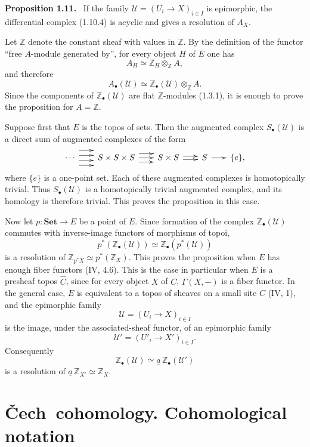\documentclass[11pt]{article}
\newcommand{\Set}{\mathbf{Set}}
\newcommand{\ZZ}{\mathbb Z}
\newcommand{\Cech}{\v{C}ech}
\newenvironment{statement}[1]{\par\medskip\noindent\textbf{#1.}\ }{\par\medskip}
\begin{document}
\begin{statement}{Proposition 1.11}
If the family $\mathcal U=(U_i\to X)_{i\in I}$ is epimorphic, the differential complex (1.10.4) is acyclic and gives a resolution of $A_X$.
\end{statement}

Let $\ZZ$ denote the constant sheaf with values in $\ZZ$. By the definition of the functor ``free $A$-module generated by'', for every object $H$ of $E$ one has
\[
A_H\simeq \ZZ_H\otimes_{\ZZ}A,
\]
and therefore
\[
A_\bullet(\mathcal U)\simeq \ZZ_\bullet(\mathcal U)\otimes_{\ZZ}A.
\]
Since the components of $\ZZ_\bullet(\mathcal U)$ are flat $\ZZ$-modules (1.3.1), it is enough to prove the proposition for $A=\ZZ$.

Suppose first that $E$ is the topos of sets. Then the augmented complex $S_\bullet(\mathcal U)$ is a direct sum of augmented complexes of the form
\[
\xymatrix@C=.6cm@M=.18cm@R=.3cm{
\cdots \ar@<9pt>[r]\ar@<3pt>[r]\ar@<-3pt>[r]\ar@<-9pt>[r]&
S\times S\times S\ar@<5pt>[r]\ar[r]\ar@<-5pt>[r]&
S\times S\ar@<2pt>[r]\ar@<-2pt>[r]&
S\ar[r]&\{e\},
}
\]
where $\{e\}$ is a one-point set. Each of these augmented complexes is homotopically trivial. Thus $S_\bullet(\mathcal U)$ is a homotopically trivial augmented complex, and its homology is therefore trivial. This proves the proposition in this case.

Now let $p:\Set\to E$ be a point of $E$. Since formation of the complex $\ZZ_\bullet(\mathcal U)$ commutes with inverse-image functors of morphisms of topoi,
\[
p^*(\ZZ_\bullet(\mathcal U))\simeq
\ZZ_\bullet(p^*(\mathcal U))
\]
is a resolution of $\ZZ_{p^*X}\simeq p^*(\ZZ_X)$. This proves the proposition when $E$ has enough fiber functors (IV, 4.6). This is the case in particular when $E$ is a presheaf topos $\widehat C$, since for every object $X$ of $C$, $\Gamma(X,-)$ is a fiber functor. In the general case, $E$ is equivalent to a topos of sheaves on a small site $C$ (IV, 1), and the epimorphic family
\[
\mathcal U=(U_i\to X)_{i\in I}
\]
is the image, under the associated-sheaf functor, of an epimorphic family
\[
\mathcal U'=(U'_i\to X')_{i\in I}.
\]
Consequently
\[
\ZZ_\bullet(\mathcal U)\simeq \underline a\,\ZZ_\bullet(\mathcal U')
\]
is a resolution of $\underline a\,\ZZ_{X'}\simeq \ZZ_X$.

\section{\Cech\ cohomology. Cohomological notation}
\end{document}
